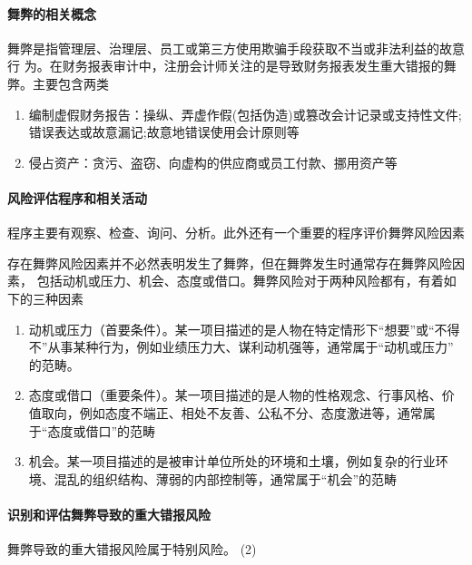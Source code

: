 \documentclass[UTF8,12pt]{ctexart}
\numberwithin{equation}{section} %
\numberwithin{figure}{section}
\numberwithin{table}{section}
\begin{document}
	\paragraph{舞弊的相关概念}
	舞弊是指管理层、治理层、员工或第三方使用欺骗手段获取不当或非法利益的故意行 为。在财务报表审计中，注册会计师关注的是导致财务报表发生重大错报的舞弊。主要包含两类
	\begin{enumerate}
		\item 编制虚假财务报告：操纵、弄虚作假(包括伪造)或篡改会计记录或支持性文件; 错误表达或故意漏记;故意地错误使用会计原则等
		
		\item 侵占资产：贪污、盗窃、向虚构的供应商或员工付款、挪用资产等
	\end{enumerate}
	
	\paragraph{风险评估程序和相关活动}
	程序主要有观察、检查、询问、分析。此外还有一个重要的程序评价舞弊风险因素
	
	存在舞弊风险因素并不必然表明发生了舞弊，但在舞弊发生时通常存在舞弊风险因素， 包括动机或压力、机会、态度或借口。舞弊风险对于两种风险都有，有着如下的三种因素
	\begin{enumerate}
		\item 动机或压力（首要条件）。某一项目描述的是人物在特定情形下“想要”或“不得不”从事某种行为，例如业绩压力大、谋利动机强等，通常属于“动机或压力” 的范畴。
		
		\item 态度或借口（重要条件）。某一项目描述的是人物的性格观念、行事风格、价值取向，例如态度不端正、相处不友善、公私不分、态度激进等，通常属于“态度或借口”的范畴
		
		\item 机会。某一项目描述的是被审计单位所处的环境和土壤，例如复杂的行业环境、混乱的组织结构、薄弱的内部控制等，通常属于“机会”的范畴
	\end{enumerate}
	
	\paragraph{识别和评估舞弊导致的重大错报风险}
	
	舞弊导致的重大错报风险属于特别风险。 (2)
	
\end{document}

